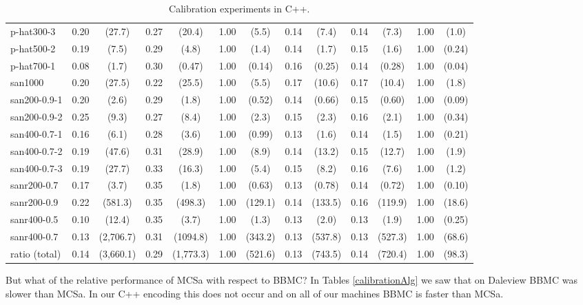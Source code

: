 \documentclass[runningheads]{llncs}
\begin{document}
\begin{table}
\begin{center}
\begin{scriptsize}
\begin{tabular}{|l|c c|c c|c c|c c|c c|c c|}
p-hat300-3 & 0.20 & (27.7) & 0.27 & (20.4) & 1.00 & (5.5) & 0.14 & (7.4) & 0.14 & (7.3) & 1.00 & (1.0) \\ 
p-hat500-2 & 0.19 & (7.5) & 0.29 & (4.8) & 1.00 & (1.4) & 0.14 & (1.7) & 0.15 & (1.6) & 1.00 & (0.24) \\ 
p-hat700-1 & 0.08 & (1.7) & 0.30 & (0.47) & 1.00 & (0.14) & 0.16 & (0.25) & 0.14 & (0.28) & 1.00 & (0.04) \\ 
san1000 & 0.20 & (27.5) & 0.22 & (25.5) & 1.00 & (5.5) & 0.17 & (10.6) & 0.17 & (10.4) & 1.00 & (1.8) \\ 
san200-0.9-1 & 0.20 & (2.6) & 0.29 & (1.8) & 1.00 & (0.52) & 0.14 & (0.66) & 0.15 & (0.60) & 1.00 & (0.09) \\ 
san200-0.9-2 & 0.25 & (9.3) & 0.27 & (8.4) & 1.00 & (2.3) & 0.15 & (2.3) & 0.16 & (2.1) & 1.00 & (0.34) \\ 
san400-0.7-1 & 0.16 & (6.1) & 0.28 & (3.6) & 1.00 & (0.99) & 0.13 & (1.6) & 0.14 & (1.5) & 1.00 & (0.21) \\ 
san400-0.7-2 & 0.19 & (47.6) & 0.31 & (28.9) & 1.00 & (8.9) & 0.14 & (13.2) & 0.15 & (12.7) & 1.00 & (1.9) \\ 
san400-0.7-3 & 0.19 & (27.7) & 0.33 & (16.3) & 1.00 & (5.4) & 0.15 & (8.2) & 0.16 & (7.6) & 1.00 & (1.2) \\ 
sanr200-0.7 & 0.17 & (3.7) & 0.35 & (1.8) & 1.00 & (0.63) & 0.13 & (0.78) & 0.14 & (0.72) & 1.00 & (0.10) \\ 
sanr200-0.9 & 0.22 & (581.3) & 0.35 & (498.3) & 1.00 & (129.1) & 0.14 & (133.5) & 0.16 & (119.9) & 1.00 & (18.6) \\
sanr400-0.5 & 0.10 & (12.4) & 0.35 & (3.7) & 1.00 & (1.3) & 0.13 & (2.0) & 0.13 & (1.9) & 1.00 & (0.25) \\ 
sanr400-0.7 & 0.13 & (2,706.7) & 0.31 & (1094.8) & 1.00 & (343.2) & 0.13 & (537.8) & 0.13 & (527.3) & 1.00 & (68.6) \\ \hline
ratio (total)    & 0.14 & (3,660.1) & 0.29 & (1,773.3) & 1.00 & (521.6) & 0.13 & (743.5) & 0.14 & (720.4) & 1.00 & (98.3) \\ \hline
\end{tabular}
\end{scriptsize}
\end{center}
\caption{Calibration experiments in C++.}
\label{cCalibration}
\end{table}

But what of the relative performance of MCSa with respect to BBMC? In Tables \ref{calibrationAlg} we saw that on Daleview BBMC 
was slower than MCSa. In our C++ encoding this does not occur and on all of our machines BBMC is faster than MCSa.
\end{document}
